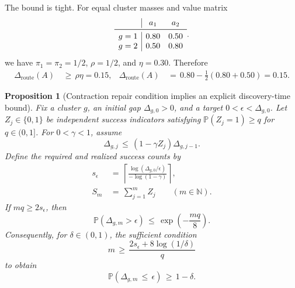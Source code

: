 \documentclass{article} %
\newtheorem{proposition}[theorem]{Proposition}
\begin{document}
The bound is tight. For equal cluster masses and value matrix
\begin{equation}
\label{eq:app-fifth-margin-example-matrix}
\begin{array}{c|cc}
& a_1 & a_2\\
\midrule
g=1 & 0.80 & 0.50\\
g=2 & 0.50 & 0.80
\end{array}.
\end{equation}
we have \(\pi_1=\pi_2=1/2\), \(\rho=1/2\), and \(\eta=0.30\). Therefore
\begin{equation}
\label{eq:app-fifth-margin-example-exact}
\begin{aligned}
\Delta_{\mathrm{route}}(A)
&\,\geq\,\rho\eta=0.15,
&
\Delta_{\mathrm{route}}(A)
&\,=\,0.80-\tfrac12(0.80+0.50)=0.15.
\end{aligned}
\end{equation}

\begin{proposition}[Contraction repair condition implies an explicit discovery-time bound]
\label{prop:14}
Fix a cluster \(g\), an initial gap \(\Delta_{g,0}>0\), and a target
\(0<\epsilon<\Delta_{g,0}\). Let \(Z_j\in\{0,1\}\) be independent success
indicators satisfying \(\mathbb P(Z_j=1)\geq q\) for \(q\in(0,1]\). For
\(0<\gamma<1\), assume
\begin{equation}
\label{eq:app-fifth-contract-recursion}
\Delta_{g,j}
\,\le\,
(1-\gamma Z_j)\Delta_{g,j-1}.
\end{equation}
Define the required and realized success counts by
\begin{align}
\label{eq:app-fifth-contract-s}
s_\epsilon
&\,=\,
\left\lceil
\frac{\log(\Delta_{g,0}/\epsilon)}
{-\log(1-\gamma)}
\right\rceil,
\\
\label{eq:app-fifth-contract-Sm}
S_m
&\,=\,
\sum_{j=1}^{m}Z_j
\qquad(m\in\mathbb N).
\end{align}
If \(mq\geq2s_\epsilon\), then
\begin{equation}
\label{eq:app-fifth-contract-tail}
\mathbb{P}(\Delta_{g,m}>\epsilon)
\,\le\,
\exp\!\left(-\frac{mq}{8}\right).
\end{equation}
Consequently, for \(\delta\in(0,1)\), the sufficient condition
\begin{equation}
\label{eq:app-fifth-contract-m-delta}
m
\,\ge\,
\frac{2s_\epsilon+8\log(1/\delta)}{q}
\end{equation}
to obtain
\begin{equation}
\label{eq:app-fifth-contract-prob}
\mathbb{P}(\Delta_{g,m}\,\le\, \epsilon)
\,\ge\,
1-\delta.
\end{equation}
\end{proposition}
\end{document}
